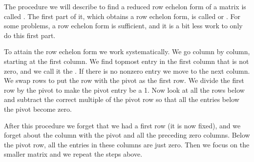 The procedure we will describe to find a reduced row echelon form
of a matrix
is called \emph{}.
The first part of it, which obtains a row echelon form, is called 
\emph{} or
\emph{}.  For some problems, a row echelon
form is sufficient, and it is a bit less work to only do this first part.

To attain the row echelon form we work systematically.
We go column by column, starting at the first column.  We find topmost
entry in the first column that is not zero, and we call it the
\emph{}.  If there is no nonzero entry
we move to the next column.  We swap rows to put the row with
the pivot as the first row.  We divide the first row
by the pivot to make the pivot entry be a 1.  Now look at all the rows below
and subtract the correct multiple of the pivot row so that all the entries
below the pivot become zero.

After this procedure we forget that we had a first row (it is now fixed),
and we forget about the column with the pivot and all the preceding zero
columns.
Below the pivot row, all the entries in these columns are just
zero.  Then we focus on the smaller matrix and we repeat the steps
above.

